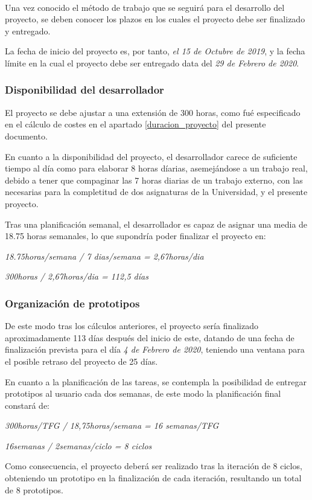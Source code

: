 \label{planificacion}

\

Una vez conocido el método de trabajo que se seguirá para el desarrollo del proyecto, se deben conocer los plazos en los cuales el proyecto debe ser finalizado y entregado.

La fecha de inicio del proyecto es, por tanto, \textit{el 15 de Octubre de 2019}, y la fecha límite en la cual el proyecto debe ser entregado data del \textit{29 de Febrero de 2020}.

\subsubsection{Disponibilidad del desarrollador}

El proyecto se debe ajustar a una extensión de 300 horas, como fué especificado en el cálculo de costes en el apartado \ref{duracion_proyecto} del presente documento.

En cuanto a la disponibilidad del proyecto, el desarrollador carece de suficiente tiempo  al día como para elaborar 8 horas díarias, asemejándose a un trabajo real, debido a tener que compaginar las 7 horas diarias de un trabajo externo, con las necesarias para la completitud de dos asignaturas de la Universidad, y el presente proyecto.

Tras una planificación semanal, el desarrollador es capaz de asignar una media de 18.75 horas semanales, lo que supondría poder finalizar el proyecto en:

\begin{center}
    \textit{18.75horas/semana / 7 dias/semana = 2,67horas/dia }
    
    \textit{300horas / 2,67horas/dia = 112,5 días }  

\end{center}

\subsubsection{Organización de prototipos}

De este modo tras los cálculos anteriores, el proyecto sería finalizado aproximadamente 113 días después del inicio de este, datando de una fecha de finalización prevista para el día \textit{4 de Febrero de 2020}, teniendo una ventana para el posible retraso del proyecto de 25 días.

En cuanto a la planificación de las tareas, se contempla la posibilidad de entregar prototipos al usuario cada dos semanas, de este modo la planificación final constará de: 

    \begin{center}
    \textit{300horas/TFG / 18,75horas/semana = 16 semanas/TFG }
    
    \textit{ 16semanas / 2semanas/ciclo = 8 ciclos}
    \end{center}{}

Como consecuencia, el proyecto deberá ser realizado tras la iteración de 8 ciclos, obteniendo un prototipo en la finalización de cada iteración, resultando un total de 8 prototipos.
